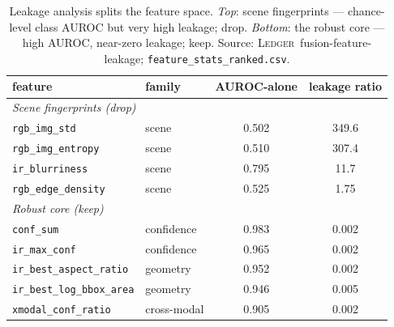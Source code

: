 \documentclass[12pt,a4paper,oneside,openright]{book}
\begin{document}
\begin{table}[htbp]
    \centering
    \caption{Leakage analysis splits the feature space. \emph{Top}: scene fingerprints --- chance-level class AUROC but very high leakage; drop. \emph{Bottom}: the robust core --- high AUROC, near-zero leakage; keep. Source: \textsc{Ledger}~fusion-feature-leakage; \texttt{feature\_stats\_ranked.csv}.}
    \label{tab:leakage}
    \begin{tabular}{llcc}
        \toprule
        feature & family & AUROC-alone & leakage ratio \\
        \midrule
        \multicolumn{4}{l}{\emph{Scene fingerprints (drop)}} \\
        \texttt{rgb\_img\_std}       & scene       & 0.502 & 349.6 \\
        \texttt{rgb\_img\_entropy}   & scene       & 0.510 & 307.4 \\
        \texttt{ir\_blurriness}      & scene       & 0.795 & 11.7 \\
        \texttt{rgb\_edge\_density}  & scene       & 0.525 & 1.75 \\
        \midrule
        \multicolumn{4}{l}{\emph{Robust core (keep)}} \\
        \texttt{conf\_sum}             & confidence  & 0.983 & 0.002 \\
        \texttt{ir\_max\_conf}         & confidence  & 0.965 & 0.002 \\
        \texttt{ir\_best\_aspect\_ratio} & geometry  & 0.952 & 0.002 \\
        \texttt{ir\_best\_log\_bbox\_area} & geometry & 0.946 & 0.005 \\
        \texttt{xmodal\_conf\_ratio}   & cross-modal & 0.905 & 0.002 \\
        \bottomrule
    \end{tabular}
\end{table}
\end{document}
